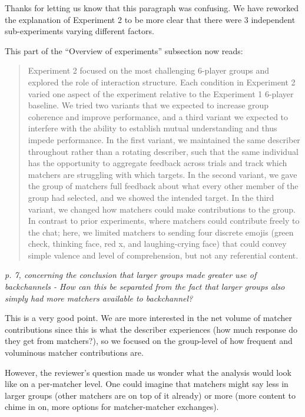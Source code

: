 \documentclass{stanfordletter}
\newcommand{\theysaid}[1]{\begin{leftbar} \noindent 
		\textsl{ #1}\end{leftbar}}
\newcommand{\revised}[1]{\begin{quote}	#1 \end{quote}}
\begin{document}
\begin{letter}{}
Thanks for letting us know that this paragraph was confusing. We have reworked the explanation of Experiment 2 to be more clear that there were 3 independent sub-experiments varying different factors. 

This part of the ``Overview of experiments'' subsection now reads: 
          
          \revised{Experiment 2 focused on the most challenging 6-player groups and explored the role of interaction structure. Each condition in Experiment 2 varied one aspect of the experiment relative to the Experiment 1 6-player baseline. We tried two variants that we expected to increase group coherence and improve performance, and a third variant we expected to interfere with the ability to establish mutual understanding and thus impede performance.
          	In the first variant, we maintained the same describer throughout rather than a rotating describer, such that the same individual has the opportunity to aggregate feedback across trials and track which matchers are struggling with which targets.
          	In the second variant, we gave the group of matchers full feedback about what every other member of the group had selected, and we showed the intended target.
          	In the third variant, we changed how matchers could make contributions to the group. In contrast to prior experiments, where matchers could contribute freely to the chat; here, we limited matchers to sending four discrete emojis (green check, thinking face, red x, and laughing-crying face) that could convey simple valence and level of comprehension, but not any referential content.}
          
          \theysaid{p. 7, concerning the conclusion that larger groups made greater use of backchannels - How can this be separated from the fact that larger groups also simply had more matchers available to backchannel?}
          
          
          This is a very good point. 
          We are more interested in the net volume of matcher contributions since this is what the describer experiences (how much response do they get from matchers?), so we focused on the group-level of how frequent and voluminous matcher contributions are. 
          
          However, the reviewer's question made us wonder what the analysis would look like on a per-matcher level. One could imagine that matchers might say less in larger groups (other matchers are on top of it already) or more (more content to chime in on, more options for matcher-matcher exchanges). 
          

\end{letter}
\end{document}
